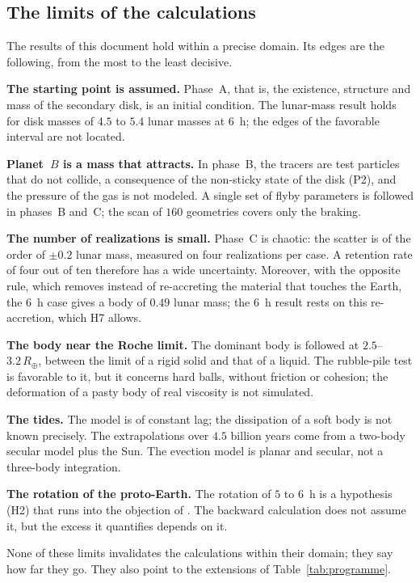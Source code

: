 \documentclass[11pt,a4paper]{article}
\newcommand{\Rt}{\ensuremath{R_\oplus}}
\begin{document}
\subsection{The limits of the calculations}
\label{sec:limites}

The results of this document hold within a precise domain. Its edges are the following, from the most to the least decisive.

\textbf{The starting point is assumed.} Phase~A, that is, the existence, structure and mass of the secondary disk, is an initial condition. The lunar-mass result holds for disk masses of $4.5$ to $5.4$ lunar masses at $6$~h; the edges of the favorable interval are not located.

\textbf{Planet~$B$ is a mass that attracts.} In phase~B, the tracers are test particles that do not collide, a consequence of the non-sticky state of the disk (P2), and the pressure of the gas is not modeled. A single set of flyby parameters is followed in phases~B and~C; the scan of $160$ geometries covers only the braking.

\textbf{The number of realizations is small.} Phase~C is chaotic: the scatter is of the order of $\pm0.2$ lunar mass, measured on four realizations per case. A retention rate of four out of ten therefore has a wide uncertainty. Moreover, with the opposite rule, which removes instead of re-accreting the material that touches the Earth, the $6$~h case gives a body of $0.49$ lunar mass; the $6$~h result rests on this re-accretion, which H7 allows.

\textbf{The body near the Roche limit.} The dominant body is followed at $2.5$--$3.2\,\Rt$, between the limit of a rigid solid and that of a liquid. The rubble-pile test is favorable to it, but it concerns hard balls, without friction or cohesion; the deformation of a pasty body of real viscosity is not simulated.

\textbf{The tides.} The model is of constant lag; the dissipation of a soft body is not known precisely. The extrapolations over $4.5$ billion years come from a two-body secular model plus the Sun. The evection model is planar and secular, not a three-body integration.

\textbf{The rotation of the proto-Earth.} The rotation of $5$ to $6$~h is a hypothesis (H2) that runs into the objection of \citet{DonesTremaine1993}. The backward calculation does not assume it, but the excess it quantifies depends on it.

None of these limits invalidates the calculations within their domain; they say how far they go. They also point to the extensions of Table~\ref{tab:programme}.
\end{document}
